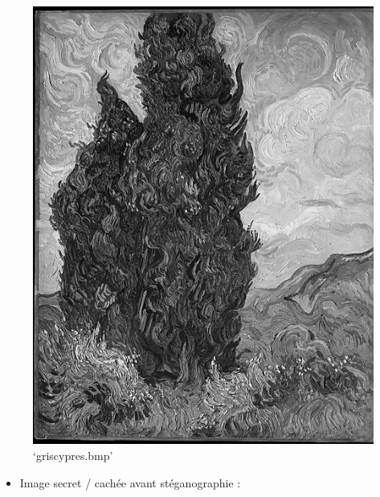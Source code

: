 \documentclass[11pt]{article}
\makeatletter
\def\maxwidth{\ifdim\Gin@nat@width>\linewidth\linewidth
    \else\Gin@nat@width\fi}
\let\Oldincludegraphics\includegraphics
\renewcommand{\includegraphics}[1]{\Oldincludegraphics[width=.8\maxwidth]{#1}}
\providecommand{\tightlist}{%
      \setlength{\itemsep}{0pt}\setlength{\parskip}{0pt}}
\makeatother
\begin{document}
\begin{figure}
\centering
\includegraphics{griscypres.bmp}
\caption{`griscypres.bmp'}
\end{figure}

\begin{itemize}
\tightlist
\item
  Image secret / cachée avant stéganographie :
\end{itemize}
\end{document}
